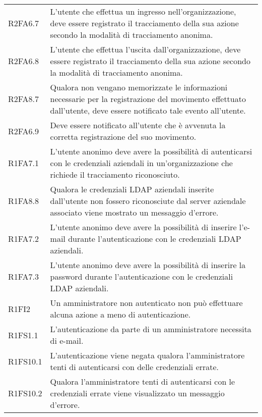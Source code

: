 {\begin{longtable}{ >{\centering}p{} >{}p{}}
R2FA6.7 & L’utente che effettua un ingresso nell’organizzazione, deve essere registrato il tracciamento della sua azione secondo la modalità di tracciamento anonima. \\

R2FA6.8 & L’utente che effettua l’uscita dall’organizzazione, deve essere registrato il tracciamento della sua azione secondo la modalità di tracciamento anonima. \\

R2FA8.7 & Qualora non vengano memorizzate le informazioni necessarie per la registrazione del movimento effettuato dall’utente, deve essere notificato tale evento all’utente. \\

R2FA6.9 & Deve essere notificato all’utente che è avvenuta la corretta registrazione del suo movimento. \\


R1FA7.1 & L'utente anonimo deve avere la possibilità di autenticarsi con le credenziali aziendali in un'organizzazione che richiede il tracciamento riconosciuto. \\

R1FA8.8 & Qualora le credenziali LDAP aziendali inserite dall'utente non fossero riconosciute dal server aziendale associato viene mostrato un messaggio d'errore. \\

R1FA7.2 & L'utente anonimo deve avere la possibilità di inserire l'e-mail durante l'autenticazione con le credenziali LDAP aziendali. \\

R1FA7.3 & L'utente anonimo deve avere la possibilità di inserire la password durante l'autenticazione con le credenziali LDAP aziendali. \\

R1FI2 & Un amministratore non autenticato non può effettuare alcuna azione a meno di autenticazione. \\

R1FS1.1 & L’autenticazione da parte di un amministratore necessita di e-mail.\\

R1FS10.1 & L’autenticazione viene negata qualora l'amministratore tenti di autenticarsi con delle credenziali errate. \\

R1FS10.2 & Qualora l'amministratore tenti di autenticarsi con le credenziali errate viene visualizzato un messaggio d’errore. \\


\end{longtable}}
